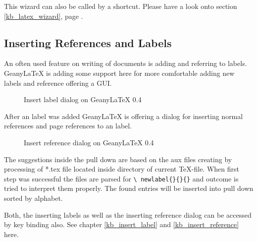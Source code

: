 \documentclass[%
a4paper,%
10pt,%
oneside,%
DIV18,
headsepline,
plainheadsepline,
footsepline,
plainfootsepline,
bibtotoc,%
liststotoc,%
BCOR12mm,%
halfparskip,%
openany,%
]{scrartcl}
\begin{document}
This wizard can also be called by a shortcut. Please have a look onto
section \ref{kb_latex_wizard}, page \pageref{kb_latex_wizard}.

\subsection{Inserting References and Labels}
An often used feature on writing of documents is adding and referring
to labels. Geany\LaTeX{} is adding some support here for more
comfortable adding new labels and reference offering a GUI.

\begin{figure}[h!]
	\caption{Insert label dialog on Geany\LaTeX{} 0.4}
\end{figure}

After an label was added Geany\LaTeX{} is offering a dialog for
inserting normal references and page references to an label.

\begin{figure}[h!]
	\caption{Insert reference dialog on Geany\LaTeX{} 0.4}
\end{figure}

The suggestions inside the pull down are based on the aux files creating
by processing of *.tex file located inside directory of current \TeX-file.
When first step was successful the files are parsed for \texttt{\textbackslash
newlabel\{\}\{\}\{\}} and outcome is tried to interpret them properly.
The found entries will be inserted into pull down sorted by alphabet.

Both, the inserting labels as well as the inserting reference dialog
can be accessed by key binding also. See chapter \ref{kb_insert_label}
and \ref{kb_insert_reference} here.
\end{document}
